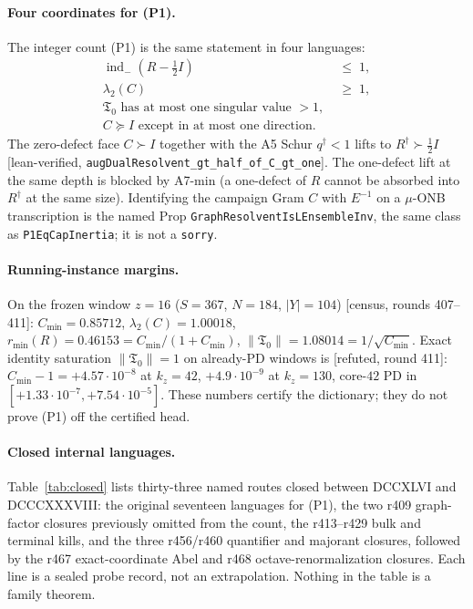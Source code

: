 \documentclass[11pt]{article}
\theoremstyle{remark}
\newcommand{\Rd}{R^{\dagger}}
\newcommand{\half}{\tfrac12}
\newcommand{\Tfrak}{\mathfrak{T}}
\newcommand{\gr}[1]{\textnormal{\small[#1]}}
\begin{document}
\paragraph{Four coordinates for (P1).}
The integer count (P1) is the same statement in four languages:
\begin{align}
\operatorname{ind}_{-}(R-\half I)&\;\le\;1,
\tag{inertia}\\
\lambda_{2}(C)&\;\ge\;1,
\tag{sampling}\\
\text{$\Tfrak_{0}$ has at most one singular value $>1$},
\tag{contraction}\\
C\succeq I
 \text{ except in at most one direction}.
\tag{energy split}
\end{align}
The zero-defect face $C\succ I$ together with the A5 Schur
$q^{\dagger}<1$ lifts to $\Rd\succ\half I$
\gr{lean-verified, \texttt{augDualResolvent\_gt\_half\_of\_C\_gt\_one}}.
The one-defect lift at the same depth is blocked by A7-min
(a one-defect of $R$ cannot be absorbed into $\Rd$ at the same
size).  Identifying the campaign Gram $C$ with $E^{-1}$ on a
$\mu$-ONB transcription is the named Prop
\texttt{GraphResolventIsLEnsembleInv}, the same class as
\texttt{P1EqCapInertia}; it is not a \texttt{sorry}.

\paragraph{Running-instance margins.}
On the frozen window $z=16$ ($S=367$, $N=184$, $|Y|=104$)
\gr{census, rounds 407--411}:
$C_{\min}=0.85712$,
$\lambda_{2}(C)=1.00018$,
$r_{\min}(R)=0.46153=C_{\min}/(1+C_{\min})$,
$\|\Tfrak_{0}\|=1.08014=1/\sqrt{C_{\min}}$.
Exact identity saturation $\|\Tfrak_{0}\|=1$ on already-PD
windows is \gr{refuted, round 411}:
$C_{\min}-1=+4.57\cdot10^{-8}$ at $k_{z}=42$,
$+4.9\cdot10^{-9}$ at $k_{z}=130$,
core-$42$ PD in $[+1.33\cdot10^{-7},+7.54\cdot10^{-5}]$.
These numbers certify the dictionary; they do not prove (P1)
off the certified head.

\paragraph{Closed internal languages.}
Table~\ref{tab:closed} lists thirty-three named routes closed
between DCCXLVI and DCCCXXXVIII: the original seventeen languages
for (P1), the two r409 graph-factor closures previously omitted
from the count, the r413--r429 bulk and terminal kills, and the
three r456/r460 quantifier and majorant closures, followed by the
r467 exact-coordinate Abel and r468 octave-renormalization closures.
Each line is a sealed probe record, not an extrapolation.
Nothing in the table is a family theorem.
\end{document}
